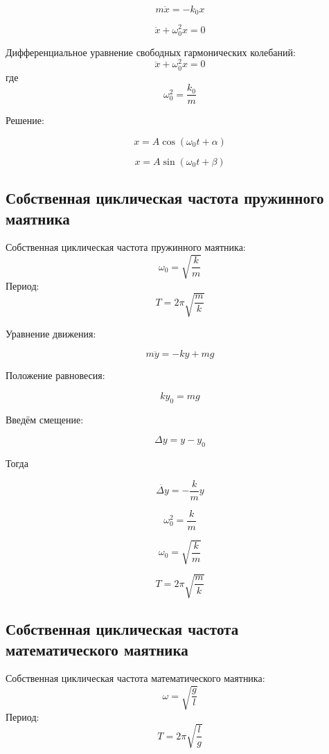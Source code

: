 \documentclass[a4paper,12pt]{article}
\begin{document}
\[
m\ddot x = -k_0 x
\]

\[
\ddot x + \omega_0^2 x = 0
\]
 

\begin{theorembox}
Дифференциальное уравнение свободных гармонических колебаний:
\[
\ddot x + \omega_0^2 x = 0
\]
где
\[
\omega_0^2 = \frac{k_0}{m}
\]
\end{theorembox}

Решение:

\[
x = A \cos(\omega_0 t + \alpha)
\]

\[
x = A \sin(\omega_0 t + \beta)
\]

\vspace{0.8em}

\subsection*{Собственная циклическая частота пружинного маятника}

\begin{theorembox}
Собственная циклическая частота пружинного маятника:
\[
\omega_0 = \sqrt{\frac{k}{m}}
\]
Период:
\[
T = 2\pi \sqrt{\frac{m}{k}}
\]
\end{theorembox}

Уравнение движения:

\[
m \ddot{y} = -ky + mg
\]

Положение равновесия:

\[ 
ky_0 = mg
\]

Введём смещение:

\[
\Delta  y = y-y_0
\]

Тогда 

\[
\ddot{\Delta y} = -\frac{k}{m}y
\]

\[
\omega_0^2 = \frac{k}{m}
\]

\[
\omega_0 = \sqrt{\frac{k}{m}}
\]

\[
T = 2\pi \sqrt{\frac{m}{k}}
\]

\vspace{0.8em}

\subsection*{Собственная циклическая частота математического маятника}

\begin{theorembox}
Собственная циклическая частота математического маятника:
\[
\omega = \sqrt{\frac{g}{l}}
\]
Период:
\[
T = 2\pi \sqrt{\frac{l}{g}}
\]
\end{theorembox}
\end{document}
